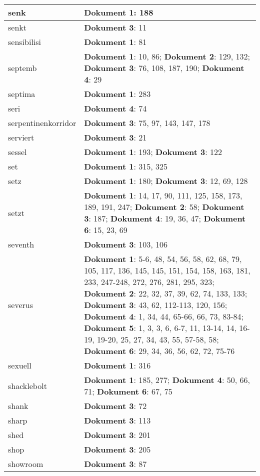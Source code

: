 \documentclass[a5paper]{article}
\begin{document}
\begin{longtable}[l]{|l|p{3in}|}
\hline
senk & \textbf{Dokument 1}: 188 \\
\hline
senkt & \textbf{Dokument 3}: 11 \\
\hline
sensibilisi & \textbf{Dokument 1}: 81 \\
\hline
septemb & \textbf{Dokument 1}: 10, 86; \textbf{Dokument 2}: 129, 132; \textbf{Dokument 3}: 76, 108, 187, 190; \textbf{Dokument 4}: 29 \\
\hline
septima & \textbf{Dokument 1}: 283 \\
\hline
seri & \textbf{Dokument 4}: 74 \\
\hline
serpentinenkorridor & \textbf{Dokument 3}: 75, 97, 143, 147, 178 \\
\hline
serviert & \textbf{Dokument 3}: 21 \\
\hline
sessel & \textbf{Dokument 1}: 193; \textbf{Dokument 3}: 122 \\
\hline
set & \textbf{Dokument 1}: 315, 325 \\
\hline
setz & \textbf{Dokument 1}: 180; \textbf{Dokument 3}: 12, 69, 128 \\
\hline
setzt & \textbf{Dokument 1}: 14, 17, 90, 111, 125, 158, 173, 189, 191, 247; \textbf{Dokument 2}: 58; \textbf{Dokument 3}: 187; \textbf{Dokument 4}: 19, 36, 47; \textbf{Dokument 6}: 15, 23, 69 \\
\hline
seventh & \textbf{Dokument 3}: 103, 106 \\
\hline
severus & \textbf{Dokument 1}: 5-6, 48, 54, 56, 58, 62, 68, 79, 105, 117, 136, 145, 145, 151, 154, 158, 163, 181, 233, 247-248, 272, 276, 281, 295, 323; \textbf{Dokument 2}: 22, 32, 37, 39, 62, 74, 133, 133; \textbf{Dokument 3}: 43, 62, 112-113, 120, 156; \textbf{Dokument 4}: 1, 34, 44, 65-66, 66, 73, 83-84; \textbf{Dokument 5}: 1, 3, 3, 6, 6-7, 11, 13-14, 14, 16-19, 19-20, 25, 27, 34, 43, 55, 57-58, 58; \textbf{Dokument 6}: 29, 34, 36, 56, 62, 72, 75-76 \\
\hline
sexuell & \textbf{Dokument 1}: 316 \\
\hline
shacklebolt & \textbf{Dokument 1}: 185, 277; \textbf{Dokument 4}: 50, 66, 71; \textbf{Dokument 6}: 67, 75 \\
\hline
shank & \textbf{Dokument 3}: 72 \\
\hline
sharp & \textbf{Dokument 3}: 113 \\
\hline
shed & \textbf{Dokument 3}: 201 \\
\hline
shop & \textbf{Dokument 3}: 205 \\
\hline
showroom & \textbf{Dokument 3}: 87 \\

\end{longtable}
\end{document}

